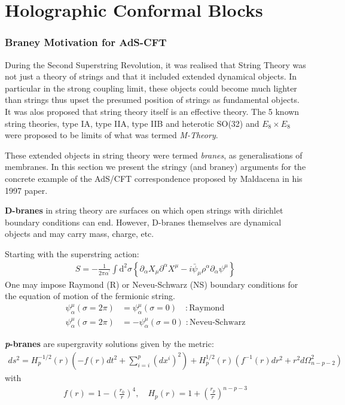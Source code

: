  \chapter{Holographic Conformal Blocks} \label{ch:holographic}
 \subsection{Braney Motivation for AdS-CFT}
 During the Second Superstring Revolution, it was realised that String Theory was not just a theory of strings and that it included extended dynamical objects. In particular in the strong coupling limit, these objects could become much lighter than strings thus upset the presumed position of strings as fundamental objects. It was alos proposed that string theory itself is an effective theory. The 5 known string theories, type IA, type IIA, type IIB and heterotic SO(32) and $E_8 \times E_8$ were proposed to be limits of what was termed \emph{M-Theory}.
 
 
 These extended objects in string theory were termed \emph{branes}, as generalisations of membranes.
 In this section we present the stringy (and braney) arguments for the concrete example of the AdS/CFT correspondence proposed by Maldacena in his 1997 paper\cite{Maldacena:1}.
 
 \textbf{D-branes} in string theory are surfaces on which open strings with dirichlet boundary conditions can end. However, D-branes themselves are dynamical objects and may carry mass, charge, etc. 
 
 Starting with the superstring action:
 \begin{align}
  S=-\frac{1}{2\pi \alpha^\prime} \int \mathrm{d}^2\sigma \left\lbrace \partial_\alpha X_\mu \partial^\alpha X^\mu - i \bar{\psi}_\mu  \rho^\alpha \partial_\alpha \psi^\mu \right\rbrace
 \end{align}
  One may impose Raymond (R) or Neveu-Schwarz (NS) boundary conditions for the equation of motion of the fermionic string.
  \begin{align}
   \psi_\alpha^\mu(\sigma = 2\pi) &= \psi_\alpha^\mu(\sigma = 0)\;\;\;\,:\text{Raymond} \\
   \psi_\alpha^\mu(\sigma = 2\pi) &= -\psi_\alpha^\mu(\sigma = 0) \;:\text{Neveu-Schwarz}
  \end{align}

 \textbf{\emph{p}-branes} are supergravity solutions given by the metric:
 \begin{align}
  ds^2=H_p^{-1/2}(r) \left( -f(r)dt^2+\sum_{i=i}^p (dx^i)^2 \right) + H_p^{1/2}(r)\left(f^{-1}(r) dr^2 + r^2d\Omega_{n-p-2}^2 \right)
 \end{align}
 with
 \begin{align}
  f(r)=1-\left(\frac{r_0}{r}\right)^4 , \quad H_p(r)=1+\left( \frac{r_p}{r} \right)^{n-p-3}
 \end{align}


